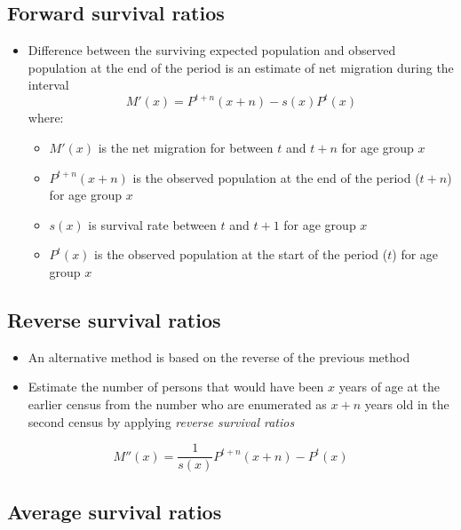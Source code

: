 \documentclass[
]{book}
\providecommand{\tightlist}{%
  \setlength{\itemsep}{0pt}\setlength{\parskip}{0pt}}
\begin{document}
\hypertarget{forward-survival-ratios}{%
\subsection{Forward survival ratios}\label{forward-survival-ratios}}

\begin{itemize}
\tightlist
\item
  Difference between the surviving expected population and observed population at the end of the period is an estimate of net migration during the interval
  \[
  M'(x) = P^{t+n}(x+n) - s(x)P^{t}(x) 
  \] where:

  \begin{itemize}
  \tightlist
  \item
    \(M'(x)\) is the net migration for between \(t\) and \(t+n\) for age group \(x\)
  \item
    \(P^{t+n}(x+n)\) is the observed population at the end of the period (\(t+n\)) for age group \(x\)
  \item
    \(s(x)\) is survival rate between \(t\) and \(t+1\) for age group \(x\)
  \item
    \(P^{t}(x)\) is the observed population at the start of the period (\(t\)) for age group \(x\)
  \end{itemize}
\end{itemize}

\hypertarget{reverse-survival-ratios}{%
\subsection{Reverse survival ratios}\label{reverse-survival-ratios}}

\begin{itemize}
\tightlist
\item
  An alternative method is based on the reverse of the previous method
\item
  Estimate the number of persons that would have been \(x\) years of age at the earlier census from the number who are enumerated as \(x+n\) years old in the second census by applying \emph{reverse survival ratios}
\end{itemize}

\[
M''(x) = \frac{1}{s(x)}P^{t+n}(x+n) - P^{t}(x) 
\]

\hypertarget{average-survival-ratios}{%
\subsection{Average survival ratios}\label{average-survival-ratios}}
\end{document}
